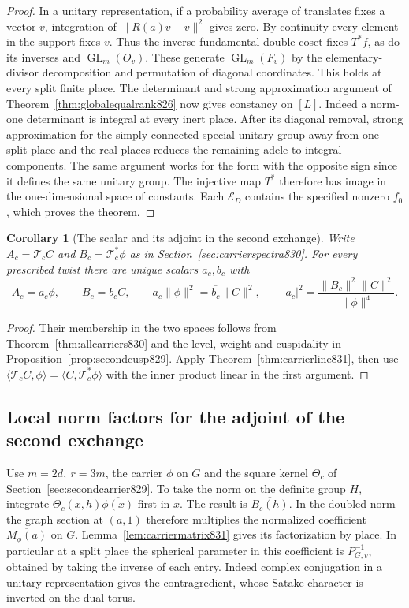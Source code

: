 \documentclass[a4paper,11pt]{article}
\newtheorem{corollary}[proposition]{Corollary}
\theoremstyle{definition}
\theoremstyle{remark}
\numberwithin{equation}{section}
\begin{document}
\begin{proof}
In a unitary representation, if a probability average of
translates fixes a vector \(v\), integration of
\(\|R(a)v-v\|^2\) gives zero. By continuity every element
in the support fixes \(v\). Thus the inverse fundamental
double coset fixes \(T^*f\), as do its inverses and
\(\operatorname{GL}_m(O_v)\). These generate
\(\operatorname{GL}_m(F_v)\) by the elementary-divisor
decomposition and permutation of diagonal coordinates.
This holds at every split finite place. The determinant and
strong approximation argument of Theorem~\ref{thm:globalequalrank826}
now gives constancy on \([L]\). Indeed a norm-one determinant
is integral at every inert place. After its diagonal removal,
strong approximation for the simply connected special unitary
group away from one split place and the real places reduces
the remaining adele to integral components. The same argument
works for the form with the opposite sign since it defines
the same unitary group. The injective map \(T^*\) therefore
has image in the one-dimensional space of constants. Each
\(\mathcal E_D\) contains the specified nonzero \(f_0\),
which proves the theorem.
\end{proof}

\begin{corollary}[The scalar and its adjoint in the second exchange]
\leavevmode\label{cor:carriermultiple831}
Write \(A_c=\mathcal T_c C\) and \(B_c=\mathcal T_c^*\phi\)
as in Section~\ref{sec:carrierspectra830}. For every
prescribed twist there are unique scalars \(a_c,b_c\) with
\[
 A_c=a_c\phi,\qquad B_c=b_c C,\qquad
 a_c\|\phi\|^2=\overline{b_c}\|C\|^2,\qquad
 |a_c|^2=\frac{\|B_c\|^2\|C\|^2}{\|\phi\|^4}.
\]
\end{corollary}
\begin{proof}
Their membership in the two spaces follows from
Theorem~\ref{thm:allcarriers830} and the level, weight and
cuspidality in Proposition~\ref{prop:secondcusp829}.
Apply Theorem~\ref{thm:carrierline831}, then use
\(\langle \mathcal T_c C,\phi\rangle
 =\langle C,\mathcal T_c^*\phi\rangle\)
with the inner product linear in the first argument.
\end{proof}
\clearpage

\subsection{Local norm factors for the adjoint of the second exchange}
\label{sec:secondlocal832}
Use \(m=2d,\ r=3m\), the carrier \(\phi\) on \(G\) and
the square kernel \(\Theta_c\) of Section~\ref{sec:secondcarrier829}.
To take the norm on the definite group \(H\), integrate
\(\Theta_c(x,h)\overline{\phi(x)}\) first in \(x\).
The result is \(\overline{B_c(h)}\). In the doubled norm
the graph section at \((a,1)\) therefore multiplies the
normalized coefficient \(\overline{M_\phi(a)}\) on \(G\).
Lemma~\ref{lem:carriermatrix831} gives its factorization by
place. In particular at a split place the spherical parameter
in this coefficient is \(P_{G,v}^{-1}\), obtained by taking
the inverse of each entry. Indeed complex conjugation in a
unitary representation gives the contragredient, whose
Satake character is inverted on the dual torus.
\end{document}
